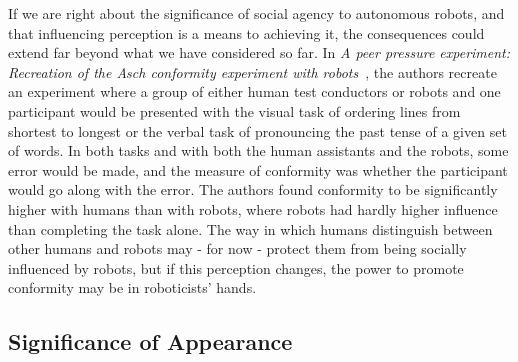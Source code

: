 \documentclass{sfuthesis}
\begin{document}
If we are right about the significance of social agency to autonomous robots, and that influencing perception is a means to achieving it, the consequences could extend far beyond what we have considered so far. In \textit{A peer pressure experiment: Recreation of the Asch conformity experiment with robots}~\cite{brandstetter2014peer}, the authors recreate an experiment where a group of either human test conductors or robots and one participant would be presented with the visual task of ordering lines from shortest to longest or the verbal task of pronouncing the past tense of a given set of words. In both tasks and with both the human assistants and the robots, some error would be made, and the measure of conformity was whether the participant would go along with the error. The authors found conformity to be significantly higher with humans than with robots, where robots had hardly higher influence than completing the task alone. The way in which humans distinguish between other humans and robots may - for now - protect them from being socially influenced by robots, but if this perception changes, the power to promote conformity may be in roboticists' hands. 







\subsection{Significance of Appearance}
\end{document}
